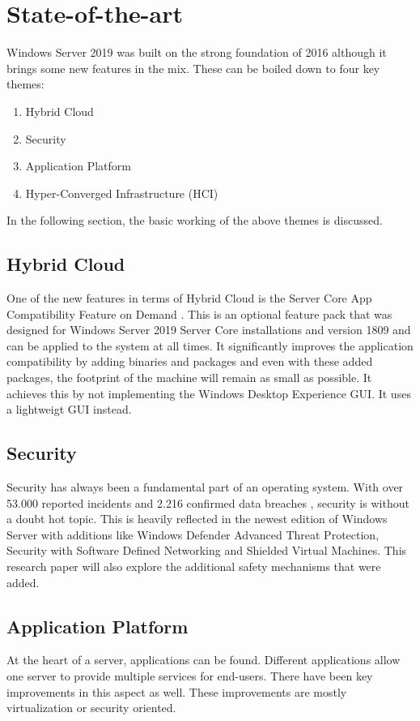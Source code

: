 \section{State-of-the-art}\label{sec:state-of-the-art}
Windows Server 2019 was built on the strong foundation of 2016 although it brings some new features \autocite{Gerend2018} in the mix. 
These can be boiled down to four key themes:
\begin{enumerate}
	\item Hybrid Cloud
	\item Security
	\item Application Platform
	\item Hyper-Converged Infrastructure (HCI)
\end{enumerate}
In the following section, the basic working of the above themes is discussed.
\subsection{Hybrid Cloud}
One of the new features in terms of Hybrid Cloud is the Server Core App Compatibility Feature on Demand \autocite{Pacquer2018}. This is an optional feature pack that was designed for Windows Server 2019 Server Core installations and version 1809 and can be applied to the system at all times. 
It significantly improves the application compatibility by adding binaries and packages and even with these added packages, the footprint of the machine will remain as small as possible. It achieves this by not implementing the Windows Desktop Experience GUI. It uses a lightweigt GUI instead.
\subsection{Security}
Security has always been a fundamental part of an operating system. With over 53.000 reported incidents and 2.216 confirmed data breaches \autocite{Verizon2018}, security is without a doubt hot topic. This is heavily reflected in the newest edition of Windows Server with additions like Windows Defender Advanced Threat Protection, Security with Software Defined Networking and Shielded Virtual Machines. This research paper will also explore the additional safety mechanisms that were added.
\subsection{Application Platform}
At the heart of a server, applications can be found. Different applications allow one server to provide multiple services for end-users. There have been key improvements in this aspect as well. These improvements are mostly virtualization or security oriented. 
